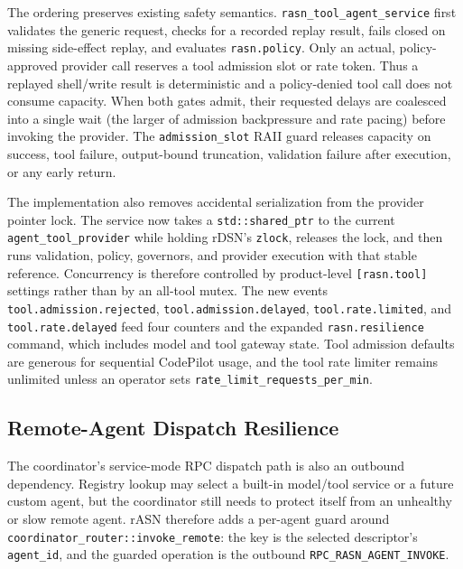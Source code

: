 \documentclass[manuscript,screen,review]{acmart}
\newcommand{\rasn}{rASN\xspace}
\newcommand{\rdsn}{rDSN\xspace}
\newcommand{\codepilot}{CodePilot\xspace}
\begin{document}
The ordering preserves existing safety semantics. \texttt{rasn\_tool\_agent\_service}
first validates the generic request, checks for a recorded replay result, fails
closed on missing side-effect replay, and evaluates \texttt{rasn.policy}. Only an
actual, policy-approved provider call reserves a tool admission slot or rate token.
Thus a replayed shell/write result is deterministic and a policy-denied tool call
does not consume capacity. When both gates admit, their requested delays are
coalesced into a single wait (the larger of admission backpressure and rate pacing)
before invoking the provider. The \texttt{admission\_slot} RAII guard releases
capacity on success, tool failure, output-bound truncation, validation failure after
execution, or any early return.

The implementation also removes accidental serialization from the provider pointer
lock. The service now takes a \texttt{std::shared\_ptr} to the current
\texttt{agent\_tool\_provider} while holding \rdsn's \texttt{zlock}, releases the
lock, and then runs validation, policy, governors, and provider execution with that
stable reference. Concurrency is therefore controlled by product-level
\texttt{[rasn.tool]} settings rather than by an all-tool mutex. The new events
\texttt{tool.admission.rejected}, \texttt{tool.admission.delayed},
\texttt{tool.rate.limited}, and \texttt{tool.rate.delayed} feed four counters and
the expanded \texttt{rasn.resilience} command, which includes model and tool
gateway state. Tool admission defaults are generous for sequential \codepilot usage,
and the tool rate limiter remains unlimited unless an operator sets
\texttt{rate\_limit\_requests\_per\_min}.

\subsection{Remote-Agent Dispatch Resilience}

The coordinator's service-mode RPC dispatch path is also an outbound dependency.
Registry lookup may select a built-in model/tool service or a future custom agent,
but the coordinator still needs to protect itself from an unhealthy or slow remote
agent. \rasn therefore adds a per-agent guard around
\texttt{coordinator\_router::invoke\_remote}: the key is the selected descriptor's
\texttt{agent\_id}, and the guarded operation is the outbound
\texttt{RPC\_RASN\_AGENT\_INVOKE}.
\end{document}
